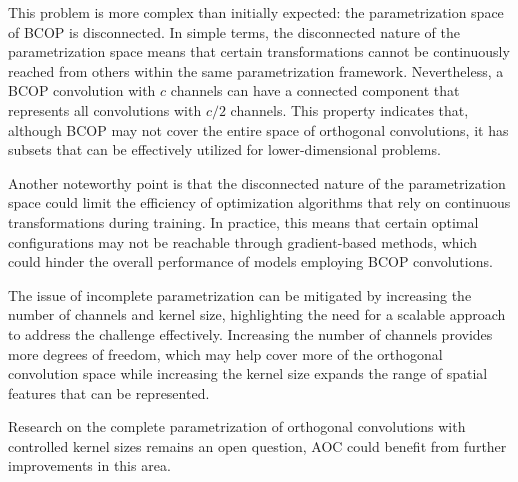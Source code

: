     This problem is more complex than initially expected: the parametrization space of BCOP is disconnected. In simple terms, the disconnected nature of the parametrization space means that certain transformations cannot be continuously reached from others within the same parametrization framework. Nevertheless, a BCOP convolution with $c$ channels can have a connected component that represents all convolutions with $c/2$ channels. This property indicates that, although BCOP may not cover the entire space of orthogonal convolutions, it has subsets that can be effectively utilized for lower-dimensional problems.
    
    Another noteworthy point is that the disconnected nature of the parametrization space could limit the efficiency of optimization algorithms that rely on continuous transformations during training. In practice, this means that certain optimal configurations may not be reachable through gradient-based methods, which could hinder the overall performance of models employing BCOP convolutions.
    
    The issue of incomplete parametrization can be mitigated by increasing the number of channels and kernel size, highlighting the need for a scalable approach to address the challenge effectively. Increasing the number of channels provides more degrees of freedom, which may help cover more of the orthogonal convolution space while increasing the kernel size expands the range of spatial features that can be represented.

    Research on the complete parametrization of orthogonal convolutions with controlled kernel sizes remains an open question, AOC could benefit from further improvements in this area.
    

